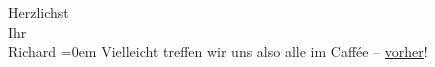 \pstart
           {\pb}Herzlichst{\\[\baselineskip]}Ihr{\\[\baselineskip]}\spacefill\mbox{Richard}\pend
           \leftskip=0em{}
\pstart
           Vielleicht treffen wir uns also alle im Caffée – \uline{vorher}!\pend
           \endnumbering{}  \newcommand{\dateiname}{L00283}\newcommand{\titel}{Richard Beer-Hofmann an Arthur Schnitzler, [15. 11. 1893?]}\newcommand{\editorInnen}{Martin Anton Müller und Gerd-Hermann Susen}
